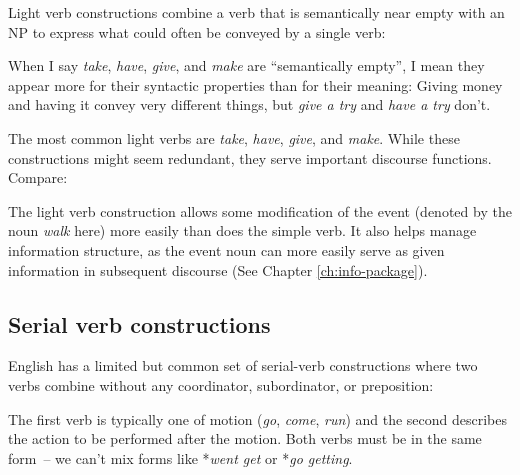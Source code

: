 Light verb constructions combine a verb that is semantically near empty with an NP to express what could often be conveyed by a single verb:

\ea\label{ex:light-verb}
   \z
\z

When I say \textit{take}, \textit{have}, \textit{give}, and \textit{make} are ``semantically empty'', I mean they appear more for their syntactic properties than for their meaning: Giving money and having it convey very different things, but \textit{give a try} and \textit{have a try} don't. 

The most common light verbs are \textit{take}, \textit{have}, \textit{give}, and \textit{make}. While these constructions might seem redundant, they serve important discourse functions. Compare:

\ea\label{ex:light-verb-use}
   \z
\z
The light verb construction allows some modification of the event (denoted by the noun \textit{walk} here) more easily than does the simple verb. It also helps manage information structure, as the event noun can more easily serve as given information in subsequent discourse (See Chapter \ref{ch:info-package}).

\subsection{Serial verb constructions} 

English has a limited but common set of serial-verb constructions where two verbs combine without any coordinator, subordinator, or preposition:

\ea\label{ex:serial}
   \z
\z

The first verb is typically one of motion (\textit{go}, \textit{come}, \textit{run}) and the second describes the action to be performed after the motion. Both verbs must be in the same form~-- we can't mix forms like *\textit{went get} or *\textit{go getting}.


